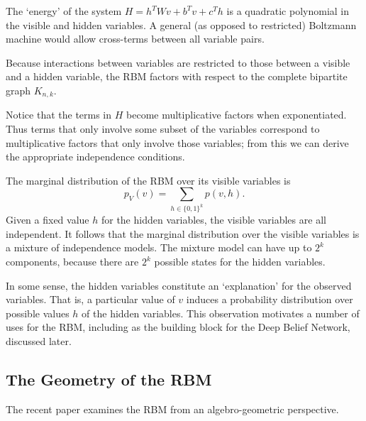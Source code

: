 \documentclass[11pt,titlepage]{article}
\begin{document}
    The `energy' of the system $H = h^T W v + b ^T v + c^T h$ is a quadratic
    polynomial in the visible and hidden variables.  A general (as opposed to
    restricted) Boltzmann machine would allow cross-terms between all variable
    pairs.

    Because interactions between variables are restricted to those between a
    visible and a hidden variable, the RBM factors with respect to the complete
    bipartite graph $K_{n,k}$.
    \begin{center}
    \end{center}
    Notice that the terms in $H$ become multiplicative factors when
    exponentiated.  Thus terms that only involve some subset of the variables
    correspond to multiplicative factors that only involve those variables; from
    this we can derive the appropriate independence conditions. 
    
    The marginal distribution of the RBM over its visible variables is
    \[
        p_V(v) = \sum_{h \in \{0,1\}^k} p(v, h).
    \]
    Given a fixed value $h$ for the hidden variables, the visible variables are
    all independent.  It follows that the marginal distribution over the visible
    variables is a mixture of independence models.  The mixture model can have
    up to $2^k$ components, because there are $2^k$ possible states for the
    hidden variables.

    In some sense, the hidden variables constitute an `explanation' for the
    observed variables.  That is, a particular value of $v$ induces a
    probability distribution over possible values $h$ of the hidden variables.
    This observation motivates a number of uses for the RBM, including as the
    building block for the Deep Belief Network, discussed later.

\subsection{The Geometry of the RBM}
    The recent paper \cite{CMS09} examines the RBM from an algebro-geometric
    perspective.
    
\end{document}
